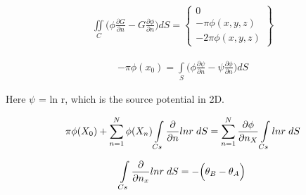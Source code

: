 \documentclass[a4paper,norsk]{article}
\begin{document}
\maketitle

\begin{align*}
\iint\limits_C \Big(\phi \frac{\partial G}{\partial n} - G\frac{\partial \phi}{\partial n}\Big) dS =
\begin{Bmatrix}
0 \\ -\pi \phi(x,y,z) \\ -2\pi \phi (x,y,z)
\end{Bmatrix}
\end{align*}


\begin{align*}
-\pi \phi(x_0) = \int\limits_S \Big(\phi \frac{\partial \psi}{\partial n} - \psi \frac{\partial \phi}{\partial n} \Big) dS
\end{align*}

Here $\psi$ = ln r, which is the source potential in 2D. 

\begin{align*}
\pi \phi(X_0) + \sum_{n=1}^N \phi(X_n) \int\limits_{Cs} \frac{\partial}{\partial n} ln r \hspace{1mm}dS = 
\sum_{n=1}^N \frac{\partial \phi}{\partial n_{X}} \int\limits_{Cs} ln r \hspace{1mm} dS
\end{align*}


\begin{align*}
\int\limits_{Cs} \frac{\partial}{\partial n_x} ln r \hspace{1mm}dS = -\Big(\theta_B - \theta_A \Big)
\end{align*}
\end{document}
